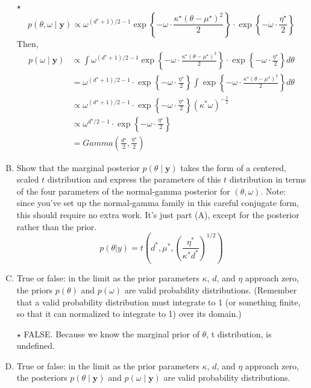 \documentclass[11pt]{article}
\newcommand{\by}{\textbf{y}}
\newcommand{\jie}{$\star$ }
\newcommand{\half}{\frac{1}{2}}
\begin{document}
\begin{enumerate}[(A)]
\bigskip
\jie
$$p(\theta, \omega \mid \by) \propto \omega^{(d^\star+1)/2 - 1} \exp \left\{ - \omega \cdot \frac{\kappa^\star (\theta - \mu^\star)^2}{2}  \right\}
\cdot \exp\left\{ -  \omega \cdot \frac{\eta^\star}{2}  \right\} $$
Then,
\begin{align*}
    p(\omega \mid \by) &\propto \int \omega^{(d^\star+1)/2 - 1} \exp \left\{ - \omega \cdot \frac{\kappa^\star (\theta - \mu^\star)^2}{2}  \right\}
\cdot \exp\left\{ -  \omega \cdot \frac{\eta^\star}{2}  \right\} d\theta \\
&= \omega^{(d^\star+1)/2 - 1} \cdot \exp\left\{ -  \omega \cdot \frac{\eta^\star}{2}  \right\} \int \exp \left\{ - \omega \cdot \frac{\kappa^\star (\theta - \mu^\star)^2}{2}  \right\} d\theta \\
&\propto \omega^{(d^\star+1)/2 - 1} \cdot \exp\left\{ -  \omega \cdot \frac{\eta^\star}{2}  \right\} (\kappa^* \omega)^{-\half} \\
&\propto \omega^{d^\star/2 - 1}\cdot \exp\left\{ -  \omega \cdot \frac{\eta^\star}{2}  \right\} \\
&= Gamma(\frac{d^\star}{2},\frac{\eta^\star}{2})
\end{align*}

\bigskip

\item Show that the marginal posterior $p(\theta \mid \by)$ takes the form of a centered, scaled $t$ distribution and express the parameters of this $t$ distribution in terms of the four parameters of the normal-gamma posterior for $(\theta, \omega)$.  Note: since you've set up the normal-gamma family in this careful conjugate form, this should require no extra work.  It's just part (A), except for the posterior rather than the prior.
$$ p(\theta|y) = t(d^*,\mu^*,(\frac{\eta^*}{\kappa^* d^*})^{1/2})$$

\item True or false: in the limit as the prior parameters $\kappa$, $d$, and $\eta$ approach zero, the priors $p(\theta)$ and $p(\omega)$ are valid probability distributions.  (Remember that a valid probability distribution must integrate to 1 (or something finite, so that it can normalized to integrate to 1) over its domain.)

\bigskip
\jie FALSE. Because we know the marginal prior of $\theta$, t distribution, is undefined.

\item True or false: in the limit as the prior parameters $\kappa$, $d$, and $\eta$ approach zero, the posteriors $p(\theta \mid \by)$ and $p(\omega \mid \by)$ are valid probability distributions.


\end{enumerate}
\end{document}
